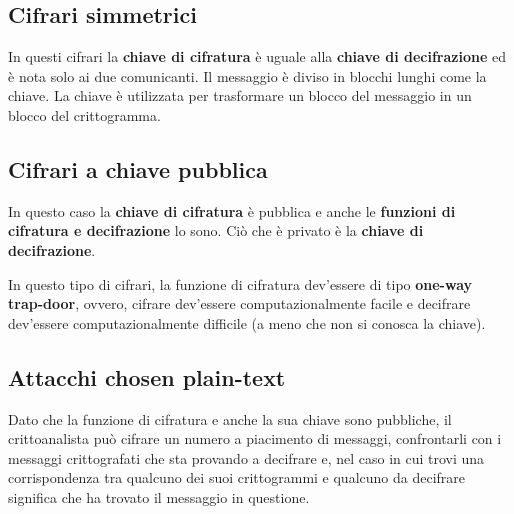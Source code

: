 \subsection{Cifrari simmetrici}
In questi cifrari la \textbf{chiave di cifratura} \`e uguale alla
\textbf{chiave di decifrazione} ed \`e nota solo ai due comunicanti. Il messaggio \`e 
diviso in blocchi lunghi come la chiave. La chiave \`e utilizzata per trasformare un 
blocco del messaggio in un blocco del crittogramma.

\subsection{Cifrari a chiave pubblica}
In questo caso la \textbf{chiave di cifratura} \`e pubblica e anche le
\textbf{funzioni di cifratura e decifrazione} lo sono. Ci\`o che \`e privato \`e la
\textbf{chiave di decifrazione}.

In questo tipo di cifrari, la funzione di cifratura dev'essere di tipo
\textbf{one-way trap-door}, ovvero, cifrare dev'essere computazionalmente facile e
decifrare dev'essere computazionalmente difficile (a meno che non si conosca la chiave).

\subsection{Attacchi chosen plain-text}
Dato che la funzione di cifratura e anche la sua chiave sono pubbliche,
il crittoanalista pu\`o cifrare un numero a piacimento di messaggi, confrontarli con i
messaggi crittografati che sta provando a decifrare e, nel caso in cui trovi una
corrispondenza tra qualcuno dei suoi crittogrammi e qualcuno da decifrare significa che
ha trovato il messaggio in questione.